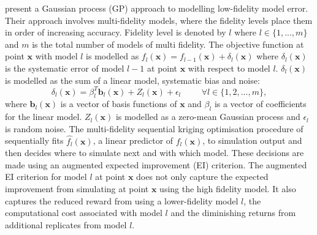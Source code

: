 \documentclass[12pt,a4paper]{article}
\begin{document}
\cite{huang2006sequential} present a Gaussian process (GP) approach to modelling low-fidelity model error. Their approach involves multi-fidelity models, where the fidelity levels place them in order of increasing accuracy. Fidelity level is denoted by $l$ where $l\in\{1, ..., m\}$ and $m$ is the total number of models of multi fidelity. The objective function at point $\boldsymbol{x}$ with model $l$ is modelled as $f_l(\boldsymbol{x}) = f_{l-1}(\boldsymbol{x}) + \delta_l(\boldsymbol{x})$ where $\delta_l(\boldsymbol{x})$ is the systematic error of model $l-1$ at point $\boldsymbol{x}$ with respect to model $l$. $\delta_l(\boldsymbol{x})$ is modelled as the sum of a linear model, systematic bias and noise:
%
\begin{equation}
  \delta_l(\boldsymbol{x}) = \beta_l^{T}\boldsymbol{b}_l(\boldsymbol{x}) + Z_l(\boldsymbol{x}) + \epsilon_l \hspace{1cm} \forall l \in \{1, 2, . . . ,m\},
\end{equation}
%
where $\boldsymbol{b}_l(\boldsymbol{x})$ is a vector of basis functions of $\boldsymbol{x}$ and $\beta_l$ is a vector of coefficients for the linear model. $Z_l(\boldsymbol{x})$ is modelled as a zero-mean Gaussian process and $\epsilon_l$ is random noise. The  multi-fidelity sequential kriging optimisation procedure of \cite{huang2006sequential} sequentially fits $\hat{f_l}(\boldsymbol{x})$, a linear predictor of $f_l(\boldsymbol{x})$, to simulation output and then decides where to simulate next and with which model. These decisions are made using an augmented expected improvement (EI) criterion. The augmented EI criterion for model $l$ at point $\boldsymbol{x}$ does not only capture the expected improvement from simulating at point $\boldsymbol{x}$ using the high fidelity model. It also captures the reduced reward from using a lower-fidelity model $l$, the computational cost associated with model $l$ and the diminishing returns from additional replicates from model $l$.
\end{document}
